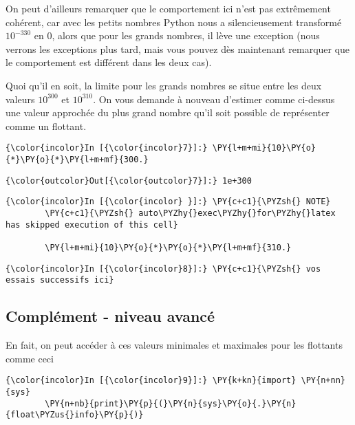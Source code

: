     On peut d'ailleurs remarquer que le comportement ici n'est pas
extrêmement cohérent, car avec les petits nombres Python nous a
silencieusement transformé \(10^{-330}\) en \(0\), alors que pour les
grands nombres, il lève une exception (nous verrons les exceptions plus
tard, mais vous pouvez dès maintenant remarquer que le comportement est
différent dans les deux cas).

    Quoi qu'il en soit, la limite pour les grands nombres se situe entre les
deux valeurs \(10^{300}\) et \(10^{310}\). On vous demande à nouveau
d'estimer comme ci-dessus une valeur approchée du plus grand nombre
qu'il soit possible de représenter comme un flottant.

    \begin{Verbatim}[commandchars=\\\{\}]
{\color{incolor}In [{\color{incolor}7}]:} \PY{l+m+mi}{10}\PY{o}{*}\PY{o}{*}\PY{l+m+mf}{300.}
\end{Verbatim}


\begin{Verbatim}[commandchars=\\\{\}]
{\color{outcolor}Out[{\color{outcolor}7}]:} 1e+300
\end{Verbatim}
            
    \begin{Verbatim}[commandchars=\\\{\}]
{\color{incolor}In [{\color{incolor} }]:} \PY{c+c1}{\PYZsh{} NOTE}
        \PY{c+c1}{\PYZsh{} auto\PYZhy{}exec\PYZhy{}for\PYZhy{}latex has skipped execution of this cell}
        
        \PY{l+m+mi}{10}\PY{o}{*}\PY{o}{*}\PY{l+m+mf}{310.}
\end{Verbatim}


    \begin{Verbatim}[commandchars=\\\{\}]
{\color{incolor}In [{\color{incolor}8}]:} \PY{c+c1}{\PYZsh{} vos essais successifs ici}
\end{Verbatim}


    \hypertarget{compluxe9ment---niveau-avancuxe9}{%
\subsection{Complément - niveau
avancé}\label{compluxe9ment---niveau-avancuxe9}}

    En fait, on peut accéder à ces valeurs minimales et maximales pour les
flottants comme ceci

    \begin{Verbatim}[commandchars=\\\{\}]
{\color{incolor}In [{\color{incolor}9}]:} \PY{k+kn}{import} \PY{n+nn}{sys}
        \PY{n+nb}{print}\PY{p}{(}\PY{n}{sys}\PY{o}{.}\PY{n}{float\PYZus{}info}\PY{p}{)}
\end{Verbatim}


